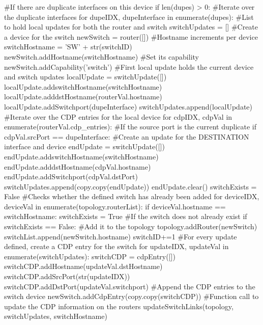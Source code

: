 \documentclass[11pt]{report}
\begin{document}
\begin{appendices}
\begin{python}
			#If there are duplicate interfaces on this device
			if len(dupes) > 0:	
				#Iterate over the duplicate interfaces
				for dupeIDX, dupeInterface in enumerate(dupes):
					#List to hold local updates for both the router and switch
					switchUpdates = []	
					#Create a device for the switch
					newSwitch = router([])
					#Hostname increments per device
					switchHostname = 'SW' + str(switchID)
					newSwitch.addHostname(switchHostname)
					#Set its capability
					newSwitch.addCapability('switch')
					#First local update holds the current device and switch updates
					localUpdate = switchUpdate([])
					localUpdate.addswitchHostname(switchHostname)
					localUpdate.adddstHostname(routerVal.hostname)
					localUpdate.addSwitchport(dupeInterface)
					switchUpdates.append(localUpdate)
					#Iterate over the CDP entries for the local device
					for cdpIDX, cdpVal in enumerate(routerVal.cdp_entries):
						#If the source port is  the current duplicate
						if cdpVal.srcPort == dupeInterface:
							#Create an update for the DESTINATION interface and device
							endUpdate = switchUpdate([])
							endUpdate.addswitchHostname(switchHostname)
							endUpdate.adddstHostname(cdpVal.hostname)
							endUpdate.addSwitchport(cdpVal.dstPort)
							switchUpdates.append(copy.copy(endUpdate))
							endUpdate.clear()
					switchExists = False
					#Checks whether the defined switch has already been added
					for deviceIDX, deviceVal in enumerate(topology.routerList):
						if deviceVal.hostname == switchHostname:
							switchExists = True
					#If the switch does not already exist
					if switchExists == False:
						#Add it to the topology
						topology.addRouter(newSwitch)
						switchList.append(newSwitch.hostname)
						switchID+=1
					#For every update defined, create a CDP entry for the switch
					for updateIDX, updateVal in enumerate(switchUpdates):
						switchCDP = cdpEntry([])
						switchCDP.addHostname(updateVal.dstHostname)
						switchCDP.addSrcPort(str(updateIDX))
						switchCDP.addDstPort(updateVal.switchport)
						#Append the CDP entries to the switch device
						newSwitch.addCdpEntry(copy.copy(switchCDP))
					#Function call to update the CDP information on the routers
					updateSwitchLinks(topology, switchUpdates, switchHostname)
\end{python}


\end{appendices}
\end{document}
